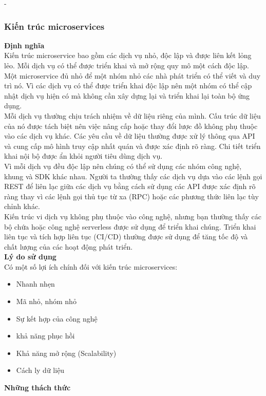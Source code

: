 \begin {list} {-}{}
\subsubsection{Kiến trúc microservices}
\noindent \textbf{Định nghĩa}\\[0.5cm]
Kiến trúc microservice bao gồm các dịch vụ nhỏ, độc lập và được liên kết lỏng lẻo. Mỗi dịch vụ có thể được triển khai và mở rộng quy mô một cách độc lập.\\[0.5cm]
Một microservice đủ nhỏ để một nhóm nhỏ các nhà phát triển có thể viết và duy trì nó. Vì các dịch vụ có thể được triển khai độc lập nên một nhóm có thể cập nhật dịch vụ hiện có mà không cần xây dựng lại và triển khai lại toàn bộ ứng dụng.\\[0.5cm]
Mỗi dịch vụ thường chịu trách nhiệm về dữ liệu riêng của mình. Cấu trúc dữ liệu của nó được tách biệt nên việc nâng cấp hoặc thay đổi lược đồ không phụ thuộc vào các dịch vụ khác. Các yêu cầu về dữ liệu thường được xử lý thông qua API và cung cấp mô hình truy cập nhất quán và được xác định rõ ràng. Chi tiết triển khai nội bộ được ẩn khỏi người tiêu dùng dịch vụ.\\[0.5cm]
Vì mỗi dịch vụ đều độc lập nên chúng có thể sử dụng các nhóm công nghệ, khung và SDK khác nhau. Người ta thường thấy các dịch vụ dựa vào các lệnh gọi REST để liên lạc giữa các dịch vụ bằng cách sử dụng các API được xác định rõ ràng thay vì các lệnh gọi thủ tục từ xa (RPC) hoặc các phương thức liên lạc tùy chỉnh khác.\\[0.5cm]
Kiến trúc vi dịch vụ không phụ thuộc vào công nghệ, nhưng bạn thường thấy các bộ chứa hoặc công nghệ serverless được sử dụng để triển khai chúng. Triển khai liên tục và tích hợp liên tục (CI/CD) thường được sử dụng để tăng tốc độ và chất lượng của các hoạt động phát triển.\\[0.5cm]
\textbf{Lý do sử dụng}\\[0.5cm]
Có một số lợi ích chính đối với kiến trúc microservices:
\begin{itemize}
    \item Nhanh nhẹn
    \item Mã nhỏ, nhóm nhỏ
    \item Sự kết hợp của công nghệ
    \item khả năng phục hồi
    \item Khả năng mở rộng (Scalability)
    \item Cách ly dữ liệu
\end{itemize}
\textbf{Những thách thức}\\[0.5cm]

\end{list}
